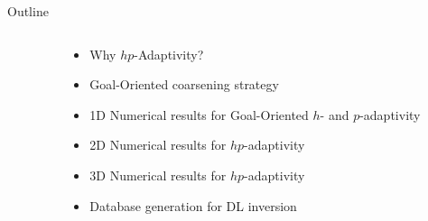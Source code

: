 {

\begin{frame}{Outline}
\begin{columns}
\begin{column}{0.05\textwidth}
\end{column}
\begin{column}{0.95\textwidth}

	\vspace{-0.2cm}
	\begin{itemize}\setlength{\itemindent}{1cm}
	\item Why \( hp \)-Adaptivity?
	\item Goal-Oriented coarsening strategy      
	\item 1D Numerical results for Goal-Oriented $h$- and $p$-adaptivity
	\item 2D Numerical results for $hp$-adaptivity
	\item 3D Numerical results for $hp$-adaptivity
	\end{itemize}

\vspace{0.4cm}

	\vspace{-0.2cm}
	\begin{itemize}\setlength{\itemindent}{1cm}
	\item Database generation for DL inversion
	\end{itemize}

\vspace{0.4cm}


\vspace{0.4cm}

\end{column}
\end{columns}

\end{frame} 
}